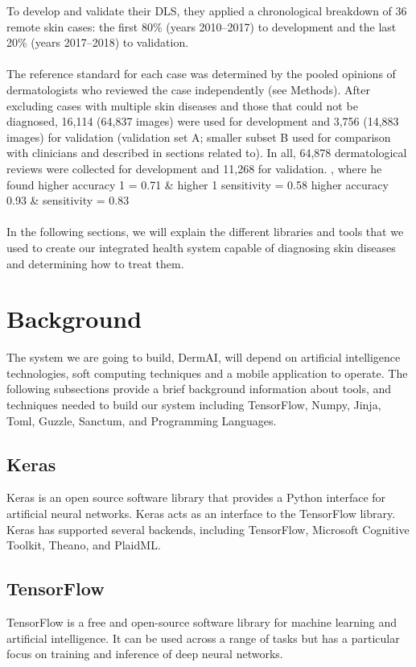 To develop and validate their DLS, they applied a chronological breakdown of 36 remote skin cases: the first 80\% (years 2010–2017) to development and the last 20\% (years 2017–2018) to validation.\\\\
The reference standard for each case was determined by the pooled opinions of dermatologists who reviewed the case independently (see Methods). After excluding cases with multiple skin diseases and those that could not be diagnosed, 16,114 (64,837 images) were used for development and 3,756 (14,883 images) for validation (validation set A; smaller subset B used for comparison with clinicians and described in sections related to). In all, 64,878 dermatological reviews were collected for development and 11,268 for validation. , where he found higher accuracy 1 = 0.71 \& higher 1 sensitivity = 0.58 higher accuracy 0.93 \& sensitivity = 0.83\\\\
In the following sections, we will explain the different libraries and tools that we used to create our integrated health system capable of diagnosing skin diseases and determining how to treat them.
\section{Background}
The system we are going to build, DermAI, will depend on artificial intelligence technologies, soft computing techniques and a mobile application to operate. The following subsections provide a brief background information about tools, and techniques needed to build our system including TensorFlow, Numpy, Jinja, Toml, Guzzle, Sanctum, and Programming Languages.
\subsection{Keras}
Keras is an open source software library that provides a Python interface for artificial neural networks. Keras acts as an interface to the TensorFlow library. Keras has supported several backends, including TensorFlow, Microsoft Cognitive Toolkit, Theano, and PlaidML.
\subsection{TensorFlow}
TensorFlow is a free and open-source software library for machine learning and artificial intelligence. It can be used across a range of tasks but has a particular focus on training and inference of deep neural networks.
